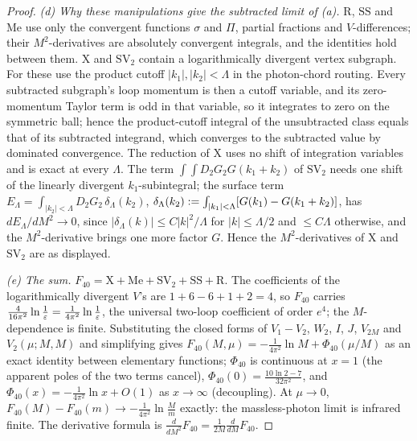 \begin{proof}
\emph{(d) Why these manipulations give the subtracted limit of (a).} $\mathrm R$, $\mathrm{SS}$ and $\mathrm{Me}$ use only the convergent functions $\sigma$ and $\Pi$, partial fractions and $V$-differences; their $M^2$-derivatives are absolutely convergent integrals, and the identities hold between them. $\mathrm X$ and $\mathrm{SV}_2$ contain a logarithmically divergent vertex subgraph. For these use the product cutoff $|k_1|,|k_2|<\Lambda$ in the photon-chord routing. Every subtracted subgraph's loop momentum is then a cutoff variable, and its zero-momentum Taylor term is odd in that variable, so it integrates to zero on the symmetric ball; hence the product-cutoff integral of the unsubtracted class equals that of its subtracted integrand, which converges to the subtracted value by dominated convergence. The reduction of $\mathrm X$ uses no shift of integration variables and is exact at every $\Lambda$. The term $\int\!\!\int D_2G_2G(k_1+k_2)$ of $\mathrm{SV}_2$ needs one shift of the linearly divergent $k_1$-subintegral; the surface term $E_\Lambda=\int_{|k_2|<\Lambda}D_2G_2\,\delta_\Lambda(k_2)$, $\delta_\Lambda(k_2):=\int_{|k_1|<\Lambda}[G(k_1)-G(k_1+k_2)]$, has $dE_\Lambda/dM^2\to0$, since $|\delta_\Lambda(k)|\le C|k|^2/\Lambda$ for $|k|\le\Lambda/2$ and $\le C\Lambda$ otherwise, and the $M^2$-derivative brings one more factor $G$. Hence the $M^2$-derivatives of $\mathrm X$ and $\mathrm{SV}_2$ are as displayed.

\emph{(e) The sum.} $F_{40}=\mathrm X+\mathrm{Me}+\mathrm{SV}_2+\mathrm{SS}+\mathrm R$. The coefficients of the logarithmically divergent $V$'s are $1+6-6+1+2=4$, so $F_{40}$ carries $\frac4{16\pi^2}\ln\frac1{\varepsilon}=\frac1{4\pi^2}\ln\frac1{\varepsilon}$, the universal two-loop coefficient of order $e^4$; the $M$-dependence is finite. Substituting the closed forms of $V_1-V_2$, $W_2$, $I$, $J$, $V_{2M}$ and $V_2(\mu;M,M)$ and simplifying gives $F_{40}(M,\mu)=-\frac1{4\pi^2}\ln M+\Phi_{40}(\mu/M)$ as an exact identity between elementary functions; $\Phi_{40}$ is continuous at $x=1$ (the apparent poles of the two terms cancel), $\Phi_{40}(0)=\frac{10\ln2-7}{32\pi^2}$, and $\Phi_{40}(x)=-\frac1{4\pi^2}\ln x+O(1)$ as $x\to\infty$ (decoupling). At $\mu\to0$, $F_{40}(M)-F_{40}(m)\to-\frac1{4\pi^2}\ln\frac Mm$ exactly: the massless-photon limit is infrared finite. The derivative formula is $\frac{d}{dM^2}F_{40}=\frac1{2M}\frac d{dM}F_{40}$.
\end{proof}

